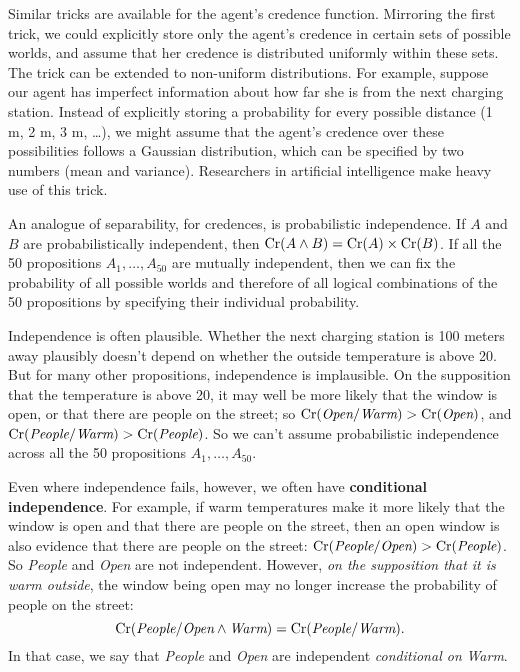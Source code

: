 Similar tricks are available for the agent's credence
function. Mirroring the first trick, we could explicitly store only
the agent's credence in certain sets of possible worlds, and assume
that her credence is distributed uniformly within these sets. The
trick can be extended to non-uniform distributions. For example,
suppose our agent has imperfect information about how far she is from
the next charging station. Instead of explicitly storing a probability
for every possible distance (1 m, 2 m, 3 m, \ldots), we might assume
that the agent's credence over these possibilities follows a Gaussian
distribution, which can be specified by two numbers (mean and
variance). Researchers in artificial intelligence make heavy use of
this trick.

An analogue of separability, for credences, is probabilistic
independence. If $A$ and $B$ are probabilistically independent, then
$\text{Cr}(A\land B) = \text{Cr}(A) \times \text{Cr}(B)$. If all the 50 propositions
$A_1,\ldots,A_{50}$ are mutually independent, then we can fix the
probability of all possible worlds and therefore of all logical
combinations of the 50 propositions by specifying their individual
probability.

Independence is often plausible. Whether the next charging station is
100 meters away plausibly doesn't depend on whether the outside
temperature is above 20\celsius. But for many other propositions,
independence is implausible. On the supposition that the temperature
is above 20\celsius, it may well be more likely that the window is
open, or that there are people on the street; so
$\text{Cr}(\emph{Open}/\emph{Warm}) > \text{Cr}(\emph{Open})$, and
$\text{Cr}(\emph{People}/\emph{Warm}) > \text{Cr}(\emph{People})$. So we can't
assume probabilistic independence across all the 50 propositions
$A_1,\ldots,A_{50}$.

Even where independence fails, however, we often have
\textbf{conditional independence}. For example, if warm temperatures
make it more likely that the window is open and that there are people
on the street, then an open window is also evidence that there are
people on the street: $\text{Cr}(\emph{People}/\emph{Open}) >
\text{Cr}(\emph{People})$.  So \emph{People} and \emph{Open} are not
independent. However, \emph{on the supposition that it is warm
  outside}, the window being open may no longer increase the
probability of people on the street:
\[
\text{Cr}(\emph{People}/\emph{Open} \land \emph{Warm}) = \text{Cr}(\emph{People}/
\emph{Warm}).
\]
In that case, we say that \emph{People} and \emph{Open} are
independent \emph{conditional on} \emph{Warm}.

